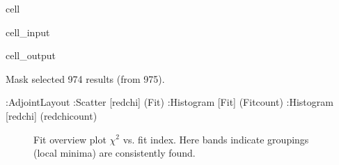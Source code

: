 \documentclass[letterpaper,table,10pt,english]{jupyterBook}
\begin{document}
\begin{sphinxuseclass}{cell}\begin{sphinxVerbatimInput}

\begin{sphinxuseclass}{cell_input}
\begin{sphinxVerbatim}[commandchars=\\\{\}]


 

\PYG{p}{[}\PYG{p}{]}\PYG{p}{[}\PYG{p}{]}
\end{sphinxVerbatim}

\end{sphinxuseclass}\end{sphinxVerbatimInput}
\begin{sphinxVerbatimOutput}

\begin{sphinxuseclass}{cell_output}
\begin{sphinxVerbatim}[commandchars=\\\{\}]
Mask selected 974 results (from 975).
\end{sphinxVerbatim}

\begin{sphinxVerbatim}[commandchars=\\\{\}]
:AdjointLayout
   :Scatter   [redchi]   (Fit)
   :Histogram   [Fit]   (Fit\PYGZus{}count)
   :Histogram   [redchi]   (redchi\PYGZus{}count)
\end{sphinxVerbatim}

\end{sphinxuseclass}\end{sphinxVerbatimOutput}

\end{sphinxuseclass}
\begin{figure}[htbp]
\centering
\capstart

\noindent{}
\caption{Fit overview plot \sphinxhyphen{} \(\chi^2\) vs. fit index. Here bands indicate groupings (local minima) are consistently found.}\label{\detokenize{part2/case-study-OCS_290723:fig-ocs-fithist}}\end{figure}
\end{document}
